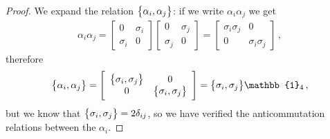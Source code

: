 \documentclass[main.tex]{subfiles}
\begin{document}
\begin{proof}
We expand the relation \(\qty{\alpha_{i}, \alpha_{j}}\): if we write \(\alpha_{i} \alpha_{j}\) we get 
%
\begin{subequations}
\begin{align}
\alpha_{i} \alpha_{j} = 
\left[\begin{array}{cc}
0 & \sigma_{i} \\ 
\sigma_{i} & 0
\end{array}\right]
\left[\begin{array}{cc}
0 & \sigma_{j} \\ 
\sigma_{j} & 0
\end{array}\right]
= \left[\begin{array}{cc}
\sigma_{i} \sigma_{j} & 0 \\ 
0 & \sigma_{i} \sigma_{j}
\end{array}\right]
\,,
\end{align}
\end{subequations}
%
therefore 
%
\begin{subequations}
\begin{align}
\qty{\alpha_{i}, \alpha_{j}} = \left[\begin{array}{cc}
\qty{\sigma_{i}, \sigma_{j}} & 0 \\ 
0 & \qty{\sigma_{i}, \sigma_{j}}
\end{array}\right]
= \qty{\sigma_{i}, \sigma_{j}} \mathbb{1}_{4}
\,,
\end{align}
\end{subequations}
%
but we know that \(\qty{\sigma_{i}, \sigma_{j}} = 2 \delta_{ij}\), so we have verified the anticommutation relations between the \(\alpha_{i}\). 


\end{proof}
\end{document}
